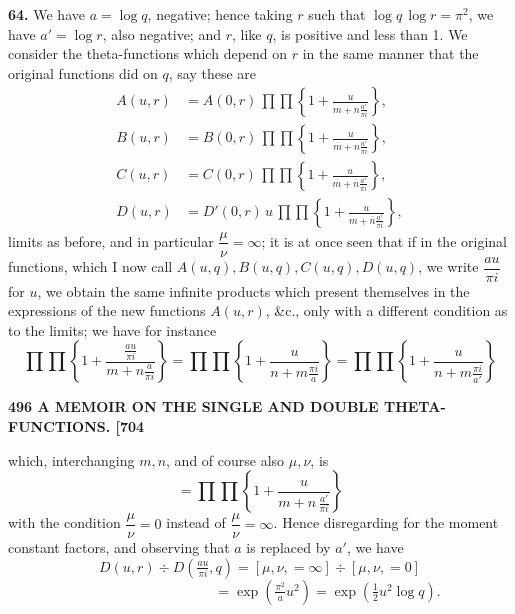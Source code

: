 \documentclass[11pt]{article}
\begin{document}
\medskip
\textbf{64.} We have $a = \log q$, negative; hence taking $r$ such that $\log q\,\log r = \pi^2$, we have $a' = \log r$, also negative; and $r$, like $q$, is positive and less than 1. We consider the theta-functions which depend on $r$ in the same manner that the original functions did on $q$, say these are
\[
\begin{aligned}
A(u,r) &= A(0,r)\,\prod\prod\!\left\{1 + \frac{u}{m+n\frac{a'}{\pi i}}\right\},\\
B(u,r) &= B(0,r)\,\prod\prod\!\left\{1 + \frac{u}{\overline{m}+n\frac{a'}{\pi i}}\right\},\\
C(u,r) &= C(0,r)\,\prod\prod\!\left\{1 + \frac{u}{\overline{m}+\overline{n}\frac{a'}{\pi i}}\right\},\\
D(u,r) &= D'(0,r)\,u\,\prod\prod\!\left\{1 + \frac{u}{m+\overline{n}\frac{a'}{\pi i}}\right\},
\end{aligned}
\]
limits as before, and in particular $\dfrac{\mu}{\nu}=\infty$; it is at once seen that if in the original functions, which I now call $A(u,q),B(u,q),C(u,q),D(u,q)$, we write $\dfrac{au}{\pi i}$ for $u$, we obtain the same infinite products which present themselves in the expressions of the new functions $A(u,r)$, \&c., only with a different condition as to the limits; we have for instance
\[
\prod\prod\!\left\{1 + \frac{\frac{au}{\pi i}}{m+n\frac{a}{\pi i}}\right\} = \prod\prod\!\left\{1 + \frac{u}{n+m\frac{\pi i}{a}}\right\} = \prod\prod\!\left\{1 + \frac{u}{n+m\frac{\pi i}{a'}}\right\}
\]

\bigskip
\noindent\textbf{496 \hfill A MEMOIR ON THE SINGLE AND DOUBLE THETA-FUNCTIONS. \hfill [704}

\medskip
which, interchanging $m,n$, and of course also $\mu,\nu$, is
\[
= \prod\prod\!\left\{1 + \frac{u}{m+n\,\frac{a'}{\pi i}}\right\}
\]
with the condition $\dfrac{\mu}{\nu}=0$ instead of $\dfrac{\mu}{\nu}=\infty$. Hence disregarding for the moment constant factors, and observing that $a$ is replaced by $a'$, we have
\[
D(u,r) \div D\!\left(\tfrac{au}{\pi i},q\right) = [\mu,\nu,=\infty] \div [\mu,\nu,=0]
\]
\[
\phantom{D(u,r) \div D\!\left(\tfrac{au}{\pi i},q\right)} = \exp\!\left(\tfrac{\pi^2}{a}u^2\right) = \exp(\tfrac{1}{2}u^2 \log q).
\]
\end{document}
